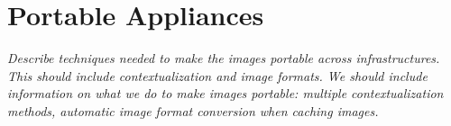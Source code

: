 \section{Portable Appliances}

{\em Describe techniques needed to make the images portable across
  infrastructures.  This should include contextualization and image
  formats.  We should include information on what we do to make images
  portable: multiple contextualization methods, automatic image format
  conversion when caching images.}


